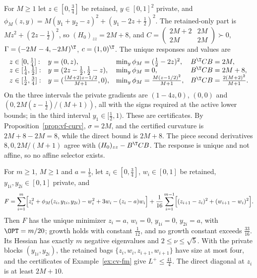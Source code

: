 \begin{example}\label{ex:cv-fm}
For $M\ge1$ let $z\in[0,\frac34]$ be retained, $y\in[0,1]^2$ private, and
$\phi_M(z,y)=M(y_1+y_2-z)^2+(y_1-2z+\frac12)^2$. The retained-only part is
$Mz^2+(2z-\frac12)^2$, so $(H_0)_{zz}=2M+8$, and
$C=\left(\begin{smallmatrix}2M+2&2M\\2M&2M\end{smallmatrix}\right)\succ0$,
$\Gamma=(-2M-4,-2M)^{\T}$, $c=(1,0)^{\T}$. The unique responses and values
are
\[
\begin{array}{llll}
z\in[0,\tfrac14]:& y=(0,z),& \min_y\phi_M=(\tfrac12-2z)^2,& B^{\T}CB=2M,\\
z\in[\tfrac14,\tfrac12]:& y=(2z-\tfrac12,\tfrac12-z),& \min_y\phi_M=0,& B^{\T}CB=2M+8,\\
z\in[\tfrac12,\tfrac34]:& y=(\tfrac{(M+2)z-1/2}{M+1},0),& \min_y\phi_M=\tfrac{M(z-1/2)^2}{M+1},
& B^{\T}CB=\tfrac{2(M+2)^2}{M+1}.
\end{array}
\]
On the three intervals the private gradients are $(1-4z,0)$, $(0,0)$ and
$(0,2M(z-\frac12)/(M+1))$, all with the signs required at the active lower
bounds; in the third interval $y_1\in[\frac12,1)$. These are certificates.
By Proposition~\ref{prop:vf-curv}, $\sigma=2M$, and the certified curvature
is $2M+8-2M=8$, while the direct bound is $2M+8$. The piece second
derivatives $8,0,2M/(M+1)$ agree with $(H_0)_{zz}-B^{\T}CB$. The response is
unique and not affine, so no affine selector exists.
\end{example}

\begin{proposition}\label{prop:cv-ladder}
For $m\ge1$, $M\ge1$ and $a=\frac15$, let $z_i\in[0,\frac34]$,
$w_i\in[0,1]$ be retained, $y_{1i},y_{2i}\in[0,1]$ private, and
\[
F=\sum_{i=1}^m\Bigl[z_i^2+\phi_M(z_i,y_{1i},y_{2i})-w_i^2+3w_i-(z_i-a)w_i\Bigr]
+\frac1{16}\sum_{i=1}^{m-1}\Bigl[(z_{i+1}-z_i)^2+(w_{i+1}-w_i)^2\Bigr].
\]
Then $F$ has the unique minimizer $z_i=a$, $w_i=0$, $y_{1i}=0$,
$y_{2i}=a$, with $\OPT=m/20$; growth holds with constant $\frac1{12}$, and
no growth constant exceeds $\frac{33}{16}$. Its Hessian has exactly $m$
negative eigenvalues and $2\le\nu\le\sqrt5$. With the private blocks
$(y_{1i},y_{2i})$, the retained bags $\{z_i,w_i,z_{i+1},w_{i+1}\}$ have size
at most four, and the certificates of Example~\ref{ex:cv-fm} give
$L^+\le\frac{41}4$. The direct diagonal at $z_i$ is at least $2M+10$.
\end{proposition}

